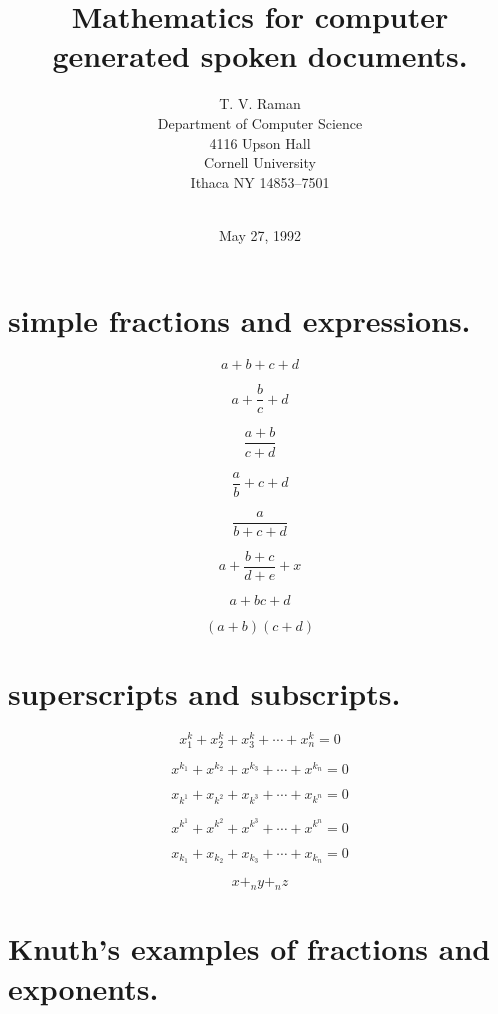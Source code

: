 

\title{Mathematics for computer generated spoken documents.}
\author{T. V. Raman\\
Department of Computer Science\\
4116 Upson Hall\\
Cornell University\\
Ithaca NY 14853--7501\\
\\
}
\date{May 27, 1992}
\maketitle


\section{simple fractions and expressions. }

$$a+b+c+d$$



$$a+\frac{b}{c} +d$$


$$\frac{a+b}{c+d}$$


$$\frac{a}{b}+c+d$$


$$\frac{a}{b+c+d}$$


$$a+\frac{b+c}{d+e}+x$$


$$a+bc+d$$


$$(a+b)(c+d)$$


\section{superscripts and subscripts.  }


$$x^k_1 +x^k_2 + x^k_3 + \cdots + x^k_n = 0$$

$$x^{k_1} + x^{k_2} + x^{k_3} + \cdots + x^{k_n} = 0$$

$$x_{k^1}+x_{k^2}+x_{k^3}+\cdots+x_{k^n}=0$$

$$x^{k^1}+x^{k^2}+x^{k^3}+\cdots+x^{k^n}=0$$

$$x_{k_1}+x_{k_2}+x_{k_3}+\cdots+x_{k_n}=0$$

$$x +_n y +_n z$$


\section{Knuth's examples of fractions and exponents. }


